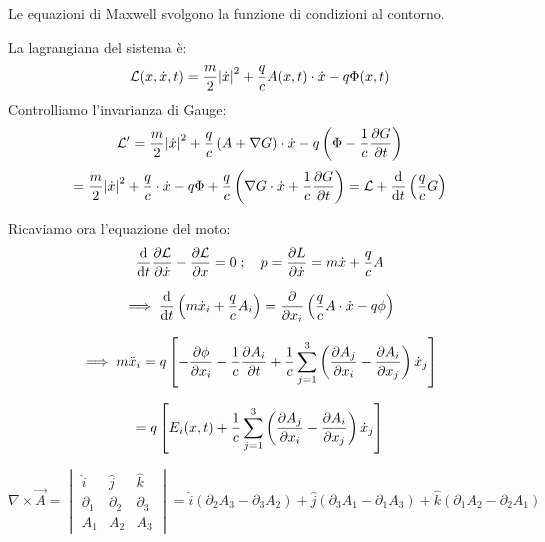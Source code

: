 \begin{remark}
    Le equazioni di Maxwell svolgono la funzione di condizioni al contorno.
\end{remark}

La lagrangiana del sistema è:
\begin{equation}
    \mathcal{L}(x,\dot{x},t)= \frac{m}{2}\abs{\dot{x}}^2+ \frac{q}{c} A(x,t)\cdot \dot{x}-q \Phi(x,t)
\end{equation}
Controlliamo l'invarianza di Gauge:
\begin{equation*}
    \mathcal{L}'= \frac{m}{2}\abs{\dot{x}}^2+ \frac{q}{c}\left( A+\nabla G \right)\cdot \dot{x}-q \left( \Phi-\frac{1}{c}\pdv{G}{t} \right)
\end{equation*}
\begin{equation}
    =\frac{m}{2}\abs{\dot{x}}^2+ \frac{q}{c} \cdot \dot{x}-q \Phi+ \frac{q}{c}\left( \nabla G \cdot \dot{x}+ \frac{1}{c}\pdv{G}{t} \right)=
    \mathcal{L}+ \dv{t}\left( \frac{q}{c}G \right)
\end{equation}

Ricaviamo ora l'equazione del moto:
\begin{equation*}
    \dv{t}\pdv{\mathcal{L}}{\dot{x}}-\pdv{\mathcal{L}}{x}=0\;;\quad p = \pdv{L}{\dot{x}} = m\dot{x} + \frac{q}{c} A
\end{equation*}

\begin{equation*}
\implies \dv{t} \left( m \dot{x}_i + \frac{q}{c} A_i \right)
= \pdv{}{x_i} \left( \frac{q}{c} A \cdot \dot{x} - q \phi \right)
\end{equation*}

\begin{equation*}
\implies m \ddot{x}_i = q \left[ - \pdv{\phi}{x_i} - \frac{1}{c} \pdv{A_i}{t} 
+ \frac{1}{c} \sum_{j=1}^{3} \left( \pdv{A_j}{x_i} - \pdv{A_i}{x_j} \right) \dot{x}_j \right]
\end{equation*}

\begin{equation*}
= q \left[ E_i(x,t) + \frac{1}{c} \sum_{j=1}^{3} \left( \pdv{A_j}{x_i} - \pdv{A_i}{x_j} \right) \dot{x}_j \right]
\end{equation*}

\begin{remark}
\begin{equation*}
\nabla \times \vec{A} = 
\begin{vmatrix}
\hat{i} & \hat{j} & \hat{k} \\
\partial_1 & \partial_2 & \partial_3 \\
A_1 & A_2 & A_3
\end{vmatrix}
=
\hat{i} (\partial_2 A_3 - \partial_3 A_2) 
+ \hat{j} (\partial_3 A_1 - \partial_1 A_3) 
+ \hat{k} (\partial_1 A_2 - \partial_2 A_1)
\end{equation*}
\end{remark}

